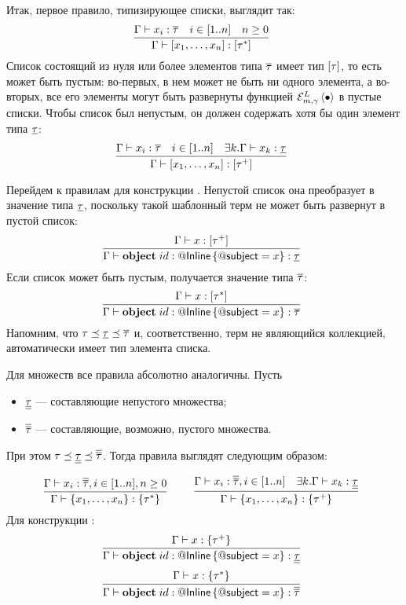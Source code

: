 Итак, первое правило, типизирующее списки, выглядит так:
$$
\trule{
	\Gamma \vdash x_i : \ELI{\tau} & i \in [1..n] & n \ge 0
}{
	\Gamma \vdash \List{x_1, \ldots, x_n} : \ListT{\tau^*}
}{}
$$ 
Список состоящий из нуля или более элементов типа $\overline{\tau}$ имеет тип $\left[\tau\right]$, то есть может быть пустым: во-первых, в нем может не быть ни одного элемента, а во-вторых, все его элементы могут быть развернуты функцией $\mathcal{E}_{m, \gamma}^{L} \left\langle \bullet \right\rangle$ в пустые списки. Чтобы список был непустым, он должен содержать хотя бы один элемент типа $\underline{\tau}$:
$$
\trule{
	\Gamma \vdash x_i : \ELI{\tau} & i \in [1..n] &
	\exists k. \Gamma \vdash x_k : \LI{\tau}
}{
	\Gamma \vdash \List{x_1, \ldots, x_n} : \ListT{\tau^+}
}{}
$$ 

Перейдем к правилам для конструкции . Непустой список она преобразует в значение типа $\underline{\tau}$, поскольку такой шаблонный терм не может быть развернут в пустой список:
$$
\trule{
	\Gamma \vdash x : \List{\tau^+}
}{
	\Gamma \vdash \Object{id}{\RefSt{Inline}}{\RefSt{subject} = x} : \LI{\tau}
}{}
$$ 
\noindent 
Если список может быть пустым, получается значение типа $\overline{\tau}$:
$$
\trule{
	\Gamma \vdash x : \List{\tau^*}
}{
	\Gamma \vdash \Object{id}{\RefSt{Inline}}{\RefSt{subject} = x} : \ELI{\tau}
}{}
$$ 
\noindent
Напомним, что $\tau \preceq \underline{\tau} \preceq \overline{\tau}$ и, соответственно, терм не являющийся коллекцией, автоматически имеет тип элемента списка.

Для множеств все правила абсолютно аналогичны. Пусть
\begin{itemize}
\item $\underline{\underline{\tau}}$ --- составляющие непустого множества;
\item $\overline{\overline{\tau}}$ --- составляющие, возможно, пустого множества.
\end{itemize}
При этом $\tau \preceq \underline{\underline{\tau}} \preceq \overline{\overline{\tau}}$. Тогда правила выглядят следующим образом:

$$
\trule{
	\Gamma \vdash x_i : \ESI{\tau}, i \in [1..n], n \ge 0
}{
	\Gamma \vdash \Set{x_1, \ldots, x_n} : \SetT{\tau^*}
}{}
\qquad
\trule{
	\Gamma \vdash x_i : \ESI{\tau}, i \in [1..n] &
	\exists k. \Gamma \vdash x_k : \SI{\tau}
}{
	\Gamma \vdash \Set{x_1, \ldots, x_n} : \SetT{\tau^+}
}{}
$$ 
Для конструкции :
$$
\trule{
	\Gamma \vdash x : \Set{\tau^+}
}{
	\Gamma \vdash \Object{id}{\RefSt{Inline}}{\RefSt{subject} = x} : \SI{\tau}
}{}
$$ $$
\trule{
	\Gamma \vdash x : \Set{\tau^*}
}{
	\Gamma \vdash \Object{id}{\RefSt{Inline}}{\RefSt{subject} = x} : \ESI{\tau}
}{}
$$ 

